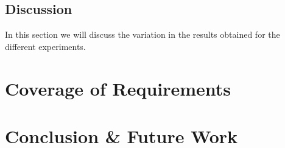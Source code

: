 \documentclass[10pt,journal,compsoc]{IEEEtran}
\begin{document}
	\subsection{Discussion}
	In this section we will discuss the variation in the results obtained for the different experiments.
	
	\section{Coverage of Requirements}

	\section{Conclusion \& Future Work}

	\ifCLASSOPTIONcaptionsoff
	\newpage
	\fi
	\nocite{*}
	
	
	
\end{document}
